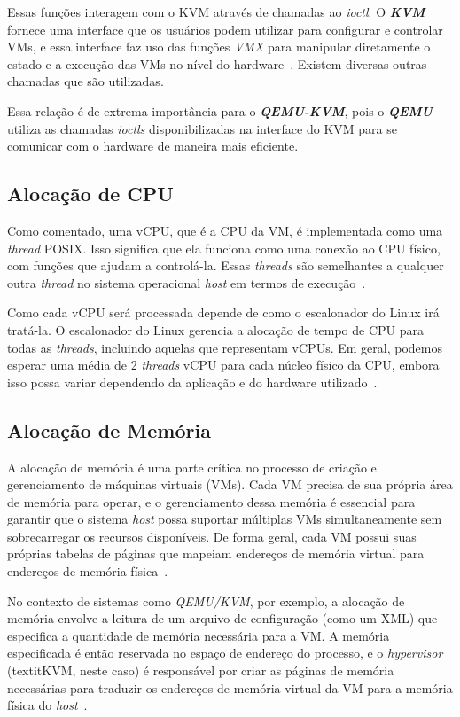 Essas funções interagem com o KVM através de chamadas ao \textit{ioctl}. O \textit{\textbf{KVM}} fornece uma interface que os usuários podem utilizar para configurar e controlar VMs, e essa interface faz uso das funções \textit{VMX} para manipular diretamente o estado e a execução das VMs no nível do hardware~\citep{zabaljauregui2008hardware}. Existem diversas outras chamadas que são utilizadas.

Essa relação é de extrema importância para o \textit{\textbf{QEMU-KVM}}, pois o \textit{\textbf{QEMU}} utiliza as chamadas \textit{ioctls} disponibilizadas na interface do KVM para se comunicar com o hardware de maneira mais eficiente.

\subsection{Alocação de CPU}

Como comentado, uma vCPU, que é a CPU da VM, é implementada como uma \textit{thread} POSIX. Isso significa que ela funciona como uma conexão ao CPU físico, com funções que ajudam a controlá-la. Essas \textit{threads} são semelhantes a qualquer outra \textit{thread} no sistema operacional \textit{host} em termos de execução~\citep{chirammal2016mastering}.

Como cada vCPU será processada depende de como o escalonador do Linux irá tratá-la. O escalonador do Linux gerencia a alocação de tempo de CPU para todas as \textit{threads}, incluindo aquelas que representam vCPUs. Em geral, podemos esperar uma média de 2 \textit{threads} vCPU para cada núcleo físico da CPU, embora isso possa variar dependendo da aplicação e do hardware utilizado~\citep{TechTargetvCPU}.

\subsection{Alocação de Memória}

A alocação de memória é uma parte crítica no processo de criação e gerenciamento de máquinas virtuais (VMs). Cada VM precisa de sua própria área de memória para operar, e o gerenciamento dessa memória é essencial para garantir que o sistema \textit{host} possa suportar múltiplas VMs simultaneamente sem sobrecarregar os recursos disponíveis. De forma geral, cada VM possui suas próprias tabelas de páginas que mapeiam endereços de memória virtual para endereços de memória física~\citep{modernOS}.

No contexto de sistemas como \textit{QEMU/KVM}, por exemplo, a alocação de memória envolve a leitura de um arquivo de configuração (como um XML) que especifica a quantidade de memória necessária para a VM. A memória especificada é então reservada no espaço de endereço do processo, e o \textit{hypervisor} (textit{KVM}, neste caso) é responsável por criar as páginas de memória necessárias para traduzir os endereços de memória virtual da VM para a memória física do \textit{host}~\citep{chirammal2016mastering}.

